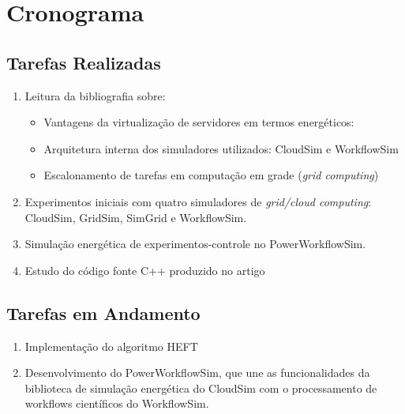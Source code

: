 \chapter{Cronograma}
\label{cap:cronograma}

\section{Tarefas Realizadas}
	\label{sec:tarefas_realizadas}
	\begin{enumerate}
		\item Leitura da bibliografia sobre:
		\begin{itemize}
			\item Vantagens da virtualização de servidores em termos energéticos:
				\cite{barroso:case_energy_proportional}
				\cite{beloglazov:energy_efficient_allocation_virtual_machines}
				\cite{berl:energy_efficient_cloud_computing}
				\cite{feng:green500_encouraging_sustainable_supercomputing}
				\cite{murugesan:harnessing_green_it}
				\cite{vmware:virtualization_right_sizes_it}
				\cite{rivoire:models_metrics_enable_energy_efficient_optimizations}
			\item Arquitetura interna dos simuladores utilizados: CloudSim e WorkflowSim
				\cite{calheiros:cloudsim}
				\cite{chen:workflowsim}
			\item Escalonamento de tarefas em computação em grade (\emph{grid 
			computing})
				\cite{chaves:scheduling_software_requirements}
				\cite{batista:embedding_software_requirements}
		\end{itemize}
		\item Experimentos iniciais com quatro simuladores de \emph{grid/cloud
			computing}: CloudSim, GridSim, SimGrid e WorkflowSim.
		\item Simulação energética de experimentos-controle no PowerWorkflowSim.
		\item Estudo do código fonte C++ produzido no artigo
			\cite{chaves:scheduling_software_requirements} 
	\end{enumerate}

\section{Tarefas em Andamento}
\label{sec:tarefas_andamento}
	\begin{enumerate}
		\item Implementação do algoritmo HEFT
		\item Desenvolvimento do PowerWorkflowSim, que une as funcionalidades
		da biblioteca de simulação energética do CloudSim com o processamento de
		workflows científicos do WorkflowSim.
	\end{enumerate}

